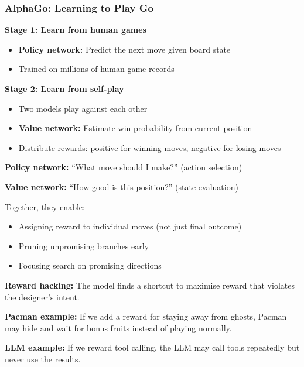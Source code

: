 \bigseparator

\subsubsection{AlphaGo: Learning to Play Go}

\begin{thmbox}
\textbf{Stage 1: Learn from human games}
\begin{itemize}
  \item \textbf{Policy network:} Predict the next move given board state
  \item Trained on millions of human game records
\end{itemize}

\textbf{Stage 2: Learn from self-play}
\begin{itemize}
  \item Two models play against each other
  \item \textbf{Value network:} Estimate win probability from current position
  \item Distribute rewards: positive for winning moves, negative for losing moves
\end{itemize}
\end{thmbox}

\begin{defbox}
\textbf{Policy network:} ``What move should I make?'' (action selection)

\textbf{Value network:} ``How good is this position?'' (state evaluation)

Together, they enable:
\begin{itemize}
  \item Assigning reward to individual moves (not just final outcome)
  \item Pruning unpromising branches early
  \item Focusing search on promising directions
\end{itemize}
\end{defbox}

\begin{defbox}
\textbf{Reward hacking:} The model finds a shortcut to maximise reward that violates the designer's intent.

\textbf{Pacman example:} If we add a reward for staying away from ghosts, Pacman may hide and wait for bonus fruits instead of playing normally.

\textbf{LLM example:} If we reward tool calling, the LLM may call tools repeatedly but never use the results.
\end{defbox}

